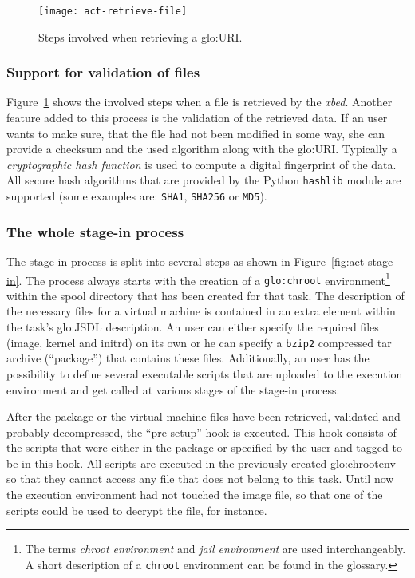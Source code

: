 \begin{figure}[ht]
  \centering
  \texttt{[image: act-retrieve-file]}
  \caption[File  Retrieval  Activity]{Steps  involved when  retrieving  a
    \gls{glo:URI}.}
  \label{fig:act-retrieve-file}
\end{figure}

\subsubsection{Support for validation of files}

Figure~\ref{fig:act-retrieve-file} shows the involved steps when a file is
retrieved by the \emph{xbed}. Another feature added to this process is the
validation of the retrieved data. If  an user wants to make sure, that the
file had not been modified in some way, she can provide a checksum and the
used    algorithm   along   with    the   \gls{glo:URI}.     Typically   a
\emph{cryptographic  hash   function}  is   used  to  compute   a  digital
fingerprint of the  data. All secure hash algorithms  that are provided by
the  Python  \texttt{hashlib} module  are  supported  (some examples  are:
\texttt{SHA1}, \texttt{SHA256} or \texttt{MD5}).

\subsubsection{The whole stage-in process}

The  stage-in   process  is   split  into  several   steps  as   shown  in
Figure~\ref{fig:act-stage-in}. The process always starts with the creation
of a \texttt{\gls{glo:chroot}} environment\footnote{The terms \emph{chroot
    environment} and \emph{jail  environment} are used interchangeably.  A
  short description of  a \texttt{chroot} environment can be  found in the
  glossary.}  within  the spool directory  that has been created  for that
task.  The  description of  the necessary files  for a virtual  machine is
contained   in  an   extra  element   within  the   task's  \gls{glo:JSDL}
description. An user can either  specify the required files (image, kernel
and initrd) on  its own or he can specify  a \texttt{bzip2} compressed tar
archive (``package'')  that contains  these files.  Additionally,  an user
has the possibility to define several executable scripts that are uploaded
to  the execution  environment and  get called  at various  stages  of the
stage-in process.

After  the package  or  the  virtual machine  files  have been  retrieved,
validated and  probably decompressed, the ``pre-setup''  hook is executed.
This  hook consists  of the  scripts that  were either  in the  package or
specified  by the user  and tagged  to be  in this  hook. All  scripts are
executed in the previously created \gls{glo:chrootenv} so that they cannot
access any file that does not belong to this task. Until now the execution
environment had  not touched the  image file, so  that one of  the scripts
could be used to decrypt the file, for instance.

